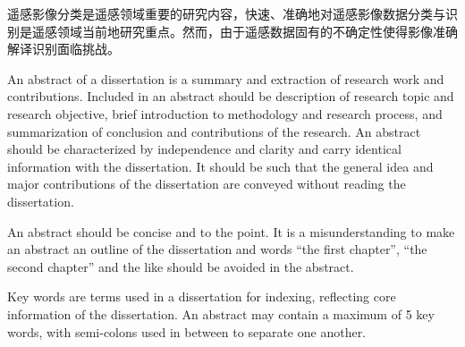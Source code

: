 

\makeatother



\begin{cabstract}
  遥感影像分类是遥感领域重要的研究内容，快速、准确地对遥感影像数据分类与识别是遥感领域当前地研究重点。然而，由于遥感数据固有的不确定性使得影像准确解译识别面临挑战。
\end{cabstract}


\begin{eabstract}
   An abstract of a dissertation is a summary and extraction of research work
   and contributions. Included in an abstract should be description of research
   topic and research objective, brief introduction to methodology and research
   process, and summarization of conclusion and contributions of the
   research. An abstract should be characterized by independence and clarity and
   carry identical information with the dissertation. It should be such that the
   general idea and major contributions of the dissertation are conveyed without
   reading the dissertation.

   An abstract should be concise and to the point. It is a misunderstanding to
   make an abstract an outline of the dissertation and words ``the first
   chapter'', ``the second chapter'' and the like should be avoided in the
   abstract.

   Key words are terms used in a dissertation for indexing, reflecting core
   information of the dissertation. An abstract may contain a maximum of 5 key
   words, with semi-colons used in between to separate one another.
\end{eabstract}

